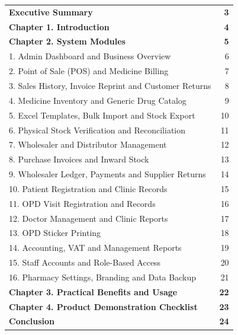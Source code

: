 \documentclass[11pt,a4paper]{article}
\begin{document}
\begin{tabularx}{\textwidth}{p{13.5cm}r}
\textbf{Executive Summary} & \textbf{3} \\
\textbf{Chapter 1. Introduction} & \textbf{4} \\
\textbf{Chapter 2. System Modules} & \textbf{5} \\
\hspace{0.5cm} 1. Admin Dashboard and Business Overview & 6 \\
\hspace{0.5cm} 2. Point of Sale (POS) and Medicine Billing & 7 \\
\hspace{0.5cm} 3. Sales History, Invoice Reprint and Customer Returns & 8 \\
\hspace{0.5cm} 4. Medicine Inventory and Generic Drug Catalog & 9 \\
\hspace{0.5cm} 5. Excel Templates, Bulk Import and Stock Export & 10 \\
\hspace{0.5cm} 6. Physical Stock Verification and Reconciliation & 11 \\
\hspace{0.5cm} 7. Wholesaler and Distributor Management & 12 \\
\hspace{0.5cm} 8. Purchase Invoices and Inward Stock & 13 \\
\hspace{0.5cm} 9. Wholesaler Ledger, Payments and Supplier Returns & 14 \\
\hspace{0.5cm} 10. Patient Registration and Clinic Records & 15 \\
\hspace{0.5cm} 11. OPD Visit Registration and Records & 16 \\
\hspace{0.5cm} 12. Doctor Management and Clinic Reports & 17 \\
\hspace{0.5cm} 13. OPD Sticker Printing & 18 \\
\hspace{0.5cm} 14. Accounting, VAT and Management Reports & 19 \\
\hspace{0.5cm} 15. Staff Accounts and Role-Based Access & 20 \\
\hspace{0.5cm} 16. Pharmacy Settings, Branding and Data Backup & 21 \\
\textbf{Chapter 3. Practical Benefits and Usage} & \textbf{22} \\
\textbf{Chapter 4. Product Demonstration Checklist} & \textbf{23} \\
\textbf{Conclusion} & \textbf{24} \\
\bottomrule
\end{tabularx}
\end{document}
